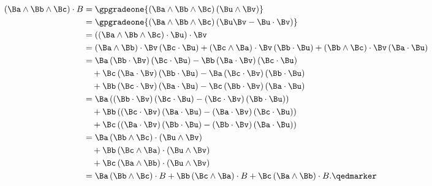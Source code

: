 \begin{equation}\label{eqn:stokesTheoremGeometricAlgebra:2860}
\begin{aligned}
\left(  \Ba \wedge \Bb \wedge \Bc  \right)
\cdot B
&=
\gpgradeone{
\left(  \Ba \wedge \Bb \wedge \Bc \right)
 \left( \Bu \wedge \Bv \right) } \\
&=
\gpgradeone{
\left(  \Ba \wedge \Bb \wedge \Bc  \right)
\left(
\Bu \Bv
- \Bu \cdot \Bv
\right) } \\
&=
\left(
\left(  \Ba \wedge \Bb \wedge \Bc  \right)
 \cdot \Bu \right) \cdot \Bv \\
&=
\left( \Ba \wedge \Bb \right) \cdot \Bv \left( \Bc \cdot \Bu \right)
+
\left( \Bc \wedge \Ba \right) \cdot \Bv \left( \Bb \cdot \Bu \right)
+
\left( \Bb \wedge \Bc \right) \cdot \Bv \left( \Ba \cdot \Bu \right) \\
&=
\Ba
\left(  \Bb \cdot \Bv  \right)
\left( \Bc \cdot \Bu \right)
-\Bb
\left(  \Ba \cdot \Bv  \right)
\left( \Bc \cdot \Bu \right) \\
&\quad +
\Bc
\left(  \Ba \cdot \Bv  \right)
\left( \Bb \cdot \Bu \right)
-
\Ba
\left(  \Bc \cdot \Bv  \right)
\left( \Bb \cdot \Bu \right) \\
&\quad +
\Bb
\left(  \Bc \cdot \Bv  \right)
\left( \Ba \cdot \Bu \right)
-
\Bc
\left(  \Bb \cdot \Bv  \right)
\left( \Ba \cdot \Bu \right) \\
&=
\Ba
\left(  \left(  \Bb \cdot \Bv  \right) \left( \Bc \cdot \Bu \right) - \left(  \Bc \cdot \Bv  \right) \left( \Bb \cdot \Bu \right)  \right)
\\
&\quad +
\Bb
\left(  \left(  \Bc \cdot \Bv  \right) \left( \Ba \cdot \Bu \right) - \left(  \Ba \cdot \Bv  \right) \left( \Bc \cdot \Bu \right)  \right)
\\
&\quad +
\Bc
\left(  \left(  \Ba \cdot \Bv  \right) \left( \Bb \cdot \Bu \right) - \left(  \Bb \cdot \Bv  \right) \left( \Ba \cdot \Bu \right)  \right)
 \\
&=
\Ba
\left(  \Bb \wedge \Bc  \right)
\cdot
\left(  \Bu \wedge \Bv  \right)
\\
&\quad +
\Bb
\left(  \Bc \wedge \Ba  \right)
\cdot
\left(  \Bu \wedge \Bv  \right)
\\
&\quad +
\Bc
\left(  \Ba \wedge \Bb  \right)
 \cdot
\left(  \Bu \wedge \Bv  \right)
\\
&=
\Ba
\left(  \Bb \wedge \Bc  \right)
\cdot B
+
\Bb
\left(  \Bc \wedge \Ba  \right)
 \cdot B
+
\Bc
\left(  \Ba \wedge \Bb  \right)
\cdot B. \qedmarker
\end{aligned}
\end{equation}

